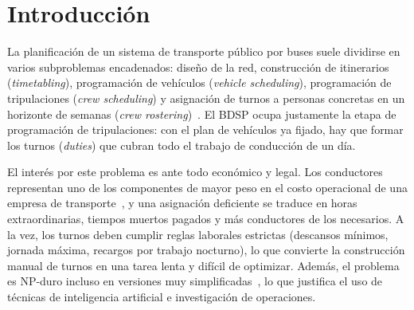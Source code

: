 \documentclass[letter, 10pt]{article}
\begin{document}
\begin{abstract}
El \emph{Bus Driver Scheduling Problem} (BDSP) consiste en construir los turnos diarios de trabajo de los conductores de una empresa de transporte público, de modo que cada tramo de recorrido de los buses sea cubierto exactamente por un conductor, respetando la legislación laboral y los convenios colectivos. Se trata de un problema de optimización combinatoria NP-duro, cuyo costo impacta directamente en la operación de las empresas, dado que la mano de obra constituye una de sus principales partidas de gasto. En este documento se define el problema y la variante a estudiar, cuyo objetivo es minimizar el tiempo pagado total bajo reglas de descanso, sobretiempo, trabajo nocturno, tiempo mínimo pagado y duración máxima del turno. Se revisa la literatura desde los modelos clásicos de partición y cobertura de conjuntos hasta las metaheurísticas y los enfoques híbridos recientes, y se propone un modelo de programación lineal entera mixta que captura todas las reglas de la variante estudiada.
\end{abstract}

\section{Introducci\'on}
La planificación de un sistema de transporte público por buses suele dividirse en varios subproblemas encadenados: diseño de la red, construcción de itinerarios (\emph{timetabling}), programación de vehículos (\emph{vehicle scheduling}), programación de tripulaciones (\emph{crew scheduling}) y asignación de turnos a personas concretas en un horizonte de semanas (\emph{crew rostering})~\cite{IbarraRojas2015,DeLeone2011a}. El BDSP ocupa justamente la etapa de programación de tripulaciones: con el plan de vehículos ya fijado, hay que formar los turnos (\emph{duties}) que cubran todo el trabajo de conducción de un día.

El interés por este problema es ante todo económico y legal. Los conductores representan uno de los componentes de mayor peso en el costo operacional de una empresa de transporte~\cite{WrenRousseau1995}, y una asignación deficiente se traduce en horas extraordinarias, tiempos muertos pagados y más conductores de los necesarios. A la vez, los turnos deben cumplir reglas laborales estrictas (descansos mínimos, jornada máxima, recargos por trabajo nocturno), lo que convierte la construcción manual de turnos en una tarea lenta y difícil de optimizar. Además, el problema es NP-duro incluso en versiones muy simplificadas~\cite{Fischetti1987,Fischetti1989}, lo que justifica el uso de técnicas de inteligencia artificial e investigación de operaciones.
\end{document}
